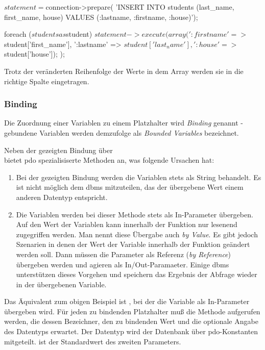 \begin{listing}[H]
\begin{phpcode}
$statement = $connection->prepare(
  'INSERT INTO students (last_name, first_name, house)
    VALUES (:lastname, :firstname, :house)');

foreach ($students as $student) {
	$statement->execute(
	  array(
	    ':firstname' => $student['first_name'],
	    ':lastname'  => $student['last_name'],
	    ':house'     => $student['house']);
	);
}
\end{phpcode}
\label{lst:insertWithPreparedStatementNamedParams}
\end{listing}

Trotz der veränderten Reihenfolge der Werte in dem Array werden sie in die richtige Spalte eingetragen.

\subsubsection{Binding}
\label{basics:doctrine:subsubsec:binding}
Die Zuordnung einer Variablen zu einem Platzhalter wird \textit{Binding} genannt - gebundene Variablen werden demzufolge als \textit{Bounded Variables} bezeichnet.

Neben der gezeigten Bindung über\\
 bietet \gls{pdo} spezialisiserte Methoden an, was folgende Ursachen hat:

\begin{enumerate}
	\item Bei der gezeigten Bindung werden die Variablen stets als String behandelt. Es ist nicht möglich dem \gls{dbms} mitzuteilen, das der übergebene Wert einem anderen Datentyp entspricht.
	\item Die Variablen werden bei dieser Methode stets als In-Parameter übergeben. Auf den Wert der Variablen kann innerhalb der Funktion nur lesenend zugegriffen werden. Man nennt diese Übergabe auch \textit{by Value}. Es gibt jedoch Szenarien in denen der Wert der Variable innerhalb der Funktion geändert werden soll. Dann müssen die Parameter als Referenz (\textit{by Reference}) übergeben werden und agieren als In/Out-Paramaeter. Einige \gls{dbms} unterstützen dieses Vorgehen und speichern das Ergebnis der Abfrage wieder in der übergebenen Variable.
\end{enumerate}

Das Äquivalent zum obigen Beispiel ist , bei der die Variable als In-Parameter übergeben wird. Für jeden zu bindenden Platzhalter muß die Methode aufgerufen werden, die dessen Bezeichner, den zu bindenden Wert und die optionale Angabe des Datentyps erwartet. Der Datentyp wird der Datenbank über \gls{pdo}-Konstanten mitgeteilt.  ist der Standardwert des zweiten Parameters.

